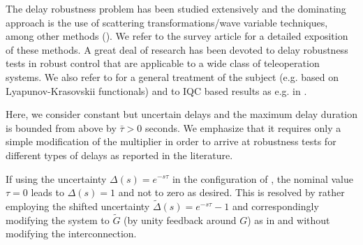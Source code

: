 The delay robustness problem has been studied extensively and the dominating approach is the use of scattering transformations/wave variable techniques, among other methods (\cite{leungfa, eusebi, andersonspong, nieslotine, nieslotine2, hokayemspong, yokokohji, lozano, arcara, parkcho, aziminejad, leespong}). We refer to the survey article \cite{hokayemspong} for a detailed exposition of these methods. A great deal of research has been devoted to delay robustness tests in robust control that are applicable to a wide class of teleoperation systems. We also refer to \cite{richard} for a general treatment of the subject (e.g. based on Lyapunov-Krasovskii functionals) and to IQC based results as e.g. in \cite{scorletti,junsafonov,kaorantzer,niculescu}.

Here, we consider constant but uncertain delays and the maximum delay duration is bounded from above by $\bar{\tau} > 0$ seconds. We emphasize that it requires only a
simple modification of the multiplier in order to arrive at robustness tests for different types of delays as reported in the literature.


If using the uncertainty $\Delta(s)=e^{-s\tau}$ in the configuration of
, the nominal value $\tau=0$ leads to $\Delta(s)=1$ and not to zero as desired. This is resolved by rather employing the shifted uncertainty
$\tilde{\Delta}(s)=e^{-s\tau}-1$ and correspondingly modifying the system
to $\tilde{G}$ (by unity feedback around $G$) as in  and without modifying the interconnection.


